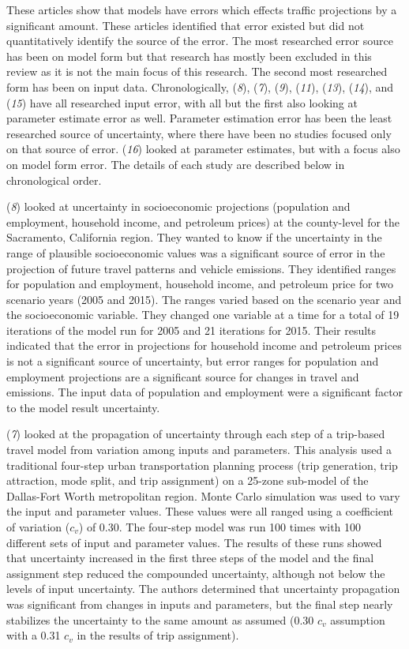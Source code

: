 \documentclass[
  letterpaper,
]{trb}
\begin{document}
These articles show that models have errors which effects traffic
projections by a significant amount. These articles identified that
error existed but did not quantitatively identify the source of the
error. The most researched error source has been on model form but that
research has mostly been excluded in this review as it is not the main
focus of this research. The second most researched form has been on
input data. Chronologically, (\emph{8}), (\emph{7}), (\emph{9}),
(\emph{11}), (\emph{13}), (\emph{14}), and (\emph{15}) have all
researched input error, with all but the first also looking at parameter
estimate error as well. Parameter estimation error has been the least
researched source of uncertainty, where there have been no studies
focused only on that source of error. (\emph{16}) looked at parameter
estimates, but with a focus also on model form error. The details of
each study are described below in chronological order.

(\emph{8}) looked at uncertainty in socioeconomic projections
(population and employment, household income, and petroleum prices) at
the county-level for the Sacramento, California region. They wanted to
know if the uncertainty in the range of plausible socioeconomic values
was a significant source of error in the projection of future travel
patterns and vehicle emissions. They identified ranges for population
and employment, household income, and petroleum price for two scenario
years (2005 and 2015). The ranges varied based on the scenario year and
the socioeconomic variable. They changed one variable at a time for a
total of 19 iterations of the model run for 2005 and 21 iterations for
2015. Their results indicated that the error in projections for
household income and petroleum prices is not a significant source of
uncertainty, but error ranges for population and employment projections
are a significant source for changes in travel and emissions. The input
data of population and employment were a significant factor to the model
result uncertainty.

(\emph{7}) looked at the propagation of uncertainty through each step of
a trip-based travel model from variation among inputs and parameters.
This analysis used a traditional four-step urban transportation planning
process (trip generation, trip attraction, mode split, and trip
assignment) on a 25-zone sub-model of the Dallas-Fort Worth metropolitan
region. Monte Carlo simulation was used to vary the input and parameter
values. These values were all ranged using a coefficient of variation
(\(c_v\)) of 0.30. The four-step model was run 100 times with 100
different sets of input and parameter values. The results of these runs
showed that uncertainty increased in the first three steps of the model
and the final assignment step reduced the compounded uncertainty,
although not below the levels of input uncertainty. The authors
determined that uncertainty propagation was significant from changes in
inputs and parameters, but the final step nearly stabilizes the
uncertainty to the same amount as assumed (0.30 \(c_v\) assumption with
a 0.31 \(c_v\) in the results of trip assignment).
\end{document}

